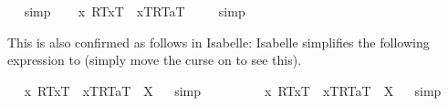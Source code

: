 \begin{isabellebody}
\isadelimproof
\ %
\endisadelimproof
%
\isatagproof
{}\isamarkupfalse%
\ simp\ \isamarkupfalse%
%
\endisatagproof
{\isafoldproof}%
%
\isadelimproof
%
\endisadelimproof
\isanewline
\isanewline
\ \isamarkupfalse%
\ {\isachardoublequoteopen}{\isacharbrackleft}{\isasymlparr}\isactrlbold {\isasymlambda}x{\isachardot}\ {\isasymlparr}R\isactrlsup T{\isacharcomma}x\isactrlsup T{\isasymrparr}\ \isactrlbold {\isasymrightarrow}\ {\isasymlbrace}x\isactrlsup T{\isacharcomma}R\isactrlsup T{\isasymrbrace}{\isacharcomma}a\isactrlsup T{\isasymrparr}{\isacharbrackright}\ {\isacharequal}\ {\isacharasterisk}{\isachardoublequoteclose}%
\isadelimproof
\ %
\endisadelimproof
%
\isatagproof
{}\isamarkupfalse%
\ simp\ \isamarkupfalse%
%
\endisatagproof
{\isafoldproof}%
%
\isadelimproof
%
\endisadelimproof
%
\begin{isamarkuptext}%
This is also confirmed as follows in Isabelle: Isabelle simplifies the following expression
  to  (simply move the curse on  to see this).%
\end{isamarkuptext}%
\isamarkuptrue%
\ \isamarkupfalse%
\ {\isachardoublequoteopen}{\isasymlparr}\isactrlbold {\isasymlambda}x{\isachardot}\ {\isasymlparr}R\isactrlsup T{\isacharcomma}x\isactrlsup T{\isasymrparr}\ \isactrlbold {\isasymrightarrow}\ {\isasymlbrace}x\isactrlsup T{\isacharcomma}R\isactrlsup T{\isasymrbrace}{\isacharcomma}a\isactrlsup T{\isasymrparr}\ {\isacharequal}\ X{\isachardoublequoteclose}%
\isadelimproof
\ %
\endisadelimproof
%
\isatagproof
{}\isamarkupfalse%
\ simp\ \isamarkupfalse%
\ \ \ \ \ %
%
\endisatagproof
{\isafoldproof}%
%
\isadelimproof
%
\endisadelimproof
\isanewline
\ \isamarkupfalse%
\ {\isachardoublequoteopen}{\isasymlparr}\isactrlbold {\isasymlambda}x{\isachardot}\ {\isasymlparr}R\isactrlsup T{\isacharcomma}x\isactrlsup T{\isasymrparr}\ \isactrlbold {\isasymand}\ \isactrlbold {\isasymnot}{\isasymlbrace}x\isactrlsup T{\isacharcomma}R\isactrlsup T{\isasymrbrace}{\isacharcomma}a\isactrlsup T{\isasymrparr}\ {\isacharequal}\ X{\isachardoublequoteclose}%
\isadelimproof
\ %
\endisadelimproof
%
\isatagproof
{}\isamarkupfalse%
\ simp\ \isamarkupfalse%
\ \ \ \ \ %
%
\endisatagproof
{\isafoldproof}%
%
\isadelimproof
%
\endisadelimproof
%

\end{isabellebody}
